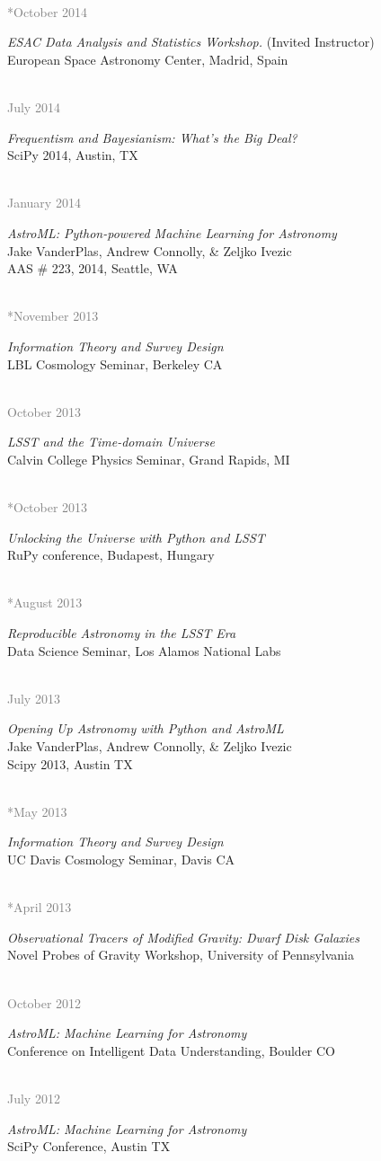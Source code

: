 \documentclass{article} %
\newlength\sidebarwidth
\newcommand{\dateonly}[2][]
	 {\begin{minipage}{\textwidth}
	 \vspace*{.4\baselineskip}
         \nopagebreak\hspace{0in}%
         \nopagebreak\begin{minipage}[t]{\sidebarwidth - .2cm}
         \raggedleft {~}
         {\\[-\baselineskip] \textcolor{gray}{\footnotesize #1}}
	 \end{minipage}%
	 \hfill
	 \begin{minipage}[t]{\linewidth - \sidebarwidth}
	 #2%
	 \end{minipage}%
	 \vspace*{.2\baselineskip plus 1\baselineskip minus
	 .2\baselineskip}%
	 \end{minipage}}
\begin{document}
  \dateonly[**October 2014]{
    {\it ESAC Data Analysis and Statistics Workshop.} (Invited Instructor)\\
    European Space Astronomy Center, Madrid, Spain
  }

  \dateonly[July 2014]{
    {\it Frequentism and Bayesianism: What's the Big Deal?}\\
    SciPy 2014, Austin, TX
  }

  \dateonly[January 2014]{
    {\it AstroML: Python-powered Machine Learning for Astronomy}\\
    Jake VanderPlas, Andrew Connolly, \& Zeljko Ivezic\\
    AAS \# 223, 2014, Seattle, WA
  }

  \dateonly[**November 2013]{
    {\it Information Theory and Survey Design}\\
    LBL Cosmology Seminar, Berkeley CA
  }

  \dateonly[October 2013]{
    {\it LSST and the Time-domain Universe}\\
    Calvin College Physics Seminar, Grand Rapids, MI
  }

  \dateonly[**October 2013]{
    {\it Unlocking the Universe with Python and LSST}\\
    RuPy conference, Budapest, Hungary
  }

  \dateonly[**August 2013]{
    {\it Reproducible Astronomy in the LSST Era}\\
    Data Science Seminar, Los Alamos National Labs
  }

  \dateonly[July 2013]{
    {\it Opening Up Astronomy with Python and AstroML}\\
    Jake VanderPlas, Andrew Connolly, \& Zeljko Ivezic\\
    Scipy 2013, Austin TX
  }

  \dateonly[**May 2013]{
    {\it Information Theory and Survey Design}\\
    UC Davis Cosmology Seminar, Davis CA
  }

  \dateonly[**April 2013]{
    {\it Observational Tracers of Modified Gravity: Dwarf Disk Galaxies}\\
    Novel Probes of Gravity Workshop, University of Pennsylvania
  }

  \dateonly[October 2012]{
    {\it AstroML: Machine Learning for Astronomy}\\
    Conference on Intelligent Data Understanding, Boulder CO
  }

  \dateonly[July 2012]{
    {\it AstroML: Machine Learning for Astronomy}\\
    SciPy Conference, Austin TX
  }
    
\end{document}

